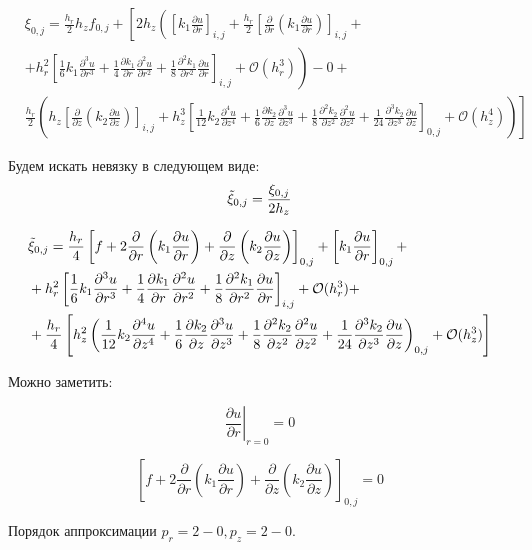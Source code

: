 \begin{align*}
  &\xi_{0, j} = \frac{h_r}{2} h_z f_{0, j} + \left[ 2h_z \left( 
    \left[ k_1 \frac{\partial u}{ \partial r} \right]_{i, j} +
    \frac{h_r}{2} \left[ \frac{\partial }{ \partial r} \left( k_1 \frac{\partial u}{ \partial r} \right) \right]_{i, j} +
  \right. \right. \\
  & \left. + h^2_r \left[
    \frac{1}{6}k_1 \frac{\partial^3 u}{ \partial r^3} +
    \frac{1}{4} \frac{\partial k_1}{ \partial r} \frac{\partial^2 u}{ \partial r^2} +
    \frac{1}{8} \frac{\partial^2 k_1}{ \partial r^2} \frac{\partial u}{ \partial r}
  \right]_{i ,j} + \mathcal{O}(h^3_r)
  \right) - 0 + \\
  & \left. \frac{h_r}{2} \left( h_z \left[ \frac{\partial }{ \partial z} \left( k_2 \frac{\partial u}{ \partial z} \right) \right]_{i, j} 
  + h^3_z \left[ 
    \frac{1}{12}k_2 \frac{\partial^4 u}{ \partial z^4}  +
    \frac{1}{6} \frac{\partial k_2}{ \partial z} \frac{\partial^3 u}{ \partial z^3} +
    \frac{1}{8} \frac{\partial^2 k_2}{ \partial z^2} \frac{\partial^2 u}{ \partial z^2} +
    \frac{1}{24} \frac{\partial^3 k_2}{ \partial z^3} \frac{\partial u}{ \partial z} \right]_{0, j}
    + \mathcal{O}(h^4_z)
    \right) \right]
\end{align*}

Будем искать невязку в следующем виде:
\[
  \Tilde{\xi}_{0, j} = \frac{\xi_{0, j}}{2 h_z}
\]

\begin{align*}
  &\Tilde{\xi}_{0, j} = \frac{h_r}{4}
  \left[ f 
  + 2\frac{\partial }{ \partial r} \left( k_1 \frac{\partial u}{ \partial r} \right)
  + \frac{\partial }{ \partial z} \left( k_2 \frac{\partial u}{ \partial z} \right)
 \right]_{0, j}
 + \left[ k_1 \frac{\partial u}{\partial r} \right]_{0, j} +\\
 & + h^2_r \left[
  \frac{1}{6}k_1 \frac{\partial^3 u}{ \partial r^3} +
  \frac{1}{4} \frac{\partial k_1}{ \partial r} \frac{\partial^2 u}{ \partial r^2} +
  \frac{1}{8} \frac{\partial^2 k_1}{ \partial r^2} \frac{\partial u}{ \partial r}
  \right]_{i ,j} + \mathcal{O}(h^3_r) + \\
 & + \frac{h_r}{4}\left[ h^2_z\left( 
  \frac{1}{12}k_2 \frac{\partial^4 u}{ \partial z^4}  +
  \frac{1}{6} \frac{\partial k_2}{ \partial z} \frac{\partial^3 u}{ \partial z^3} +
  \frac{1}{8} \frac{\partial^2 k_2}{ \partial z^2} \frac{\partial^2 u}{ \partial z^2} +
  \frac{1}{24} \frac{\partial^3 k_2}{ \partial z^3} \frac{\partial u}{ \partial z}
  \right)_{0, j}
  + \mathcal{O}(h^3_z) \right]
\end{align*}

Можно заметить:

\[
  \left. \frac{\partial u}{\partial r} \right|_{r=0} = 0
\]

\[
  \left[ f 
  + 2\frac{\partial }{ \partial r} \left( k_1 \frac{\partial u}{ \partial r} \right)
  + \frac{\partial }{ \partial z} \left( k_2 \frac{\partial u}{ \partial z} \right)
 \right]_{0, j} = 0
\]

Порядок аппроксимации $ p_r = 2 - 0, p_z = 2 - 0 $. 